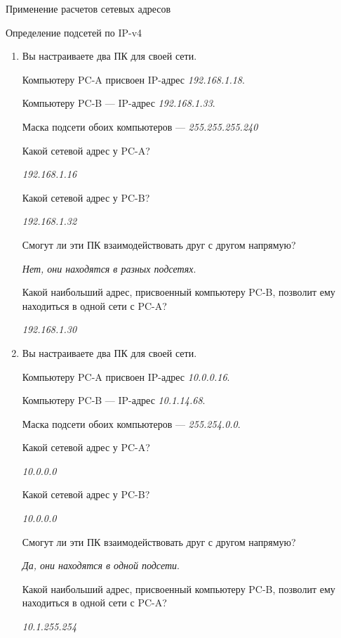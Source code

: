 \documentclass[a4paper,14pt]{extarticle}
\begin{document}
\begin{mypart}{Применение расчетов сетевых адресов}
	\begin{step}{Определение подсетей по IP-v4}
		
		\begin{enumerate}[label=\alph{enumi})]
			\item 
			Вы настраиваете два ПК для своей сети. 
			
			Компьютеру PC-A присвоен IP-адрес \textit{192.168.1.18}.
			
			Компьютеру PC-B — IP-адрес \textit{192.168.1.33}. 
			
			Маска подсети обоих компьютеров — \textit{255.255.255.240}
			
			\q Какой сетевой адрес у PC-A? 
			
			\ans \textit{192.168.1.16}
			
			\q Какой сетевой адрес у PC-B? 
			
			\ans \textit{192.168.1.32}
			
			\q Смогут ли эти ПК взаимодействовать друг с другом напрямую? 
			
			\ans \textit{Нет, они находятся в разных подсетях}.
			
			\q Какой наибольший адрес, присвоенный компьютеру PC-B, позволит ему находиться в одной сети с
			PC-A?
			
			\ans \textit{192.168.1.30}
			
			\item 
			Вы настраиваете два ПК для своей сети. 
			
			Компьютеру PC-A присвоен IP-адрес \textit{10.0.0.16}.
			
			Компьютеру PC-B — IP-адрес \textit{10.1.14.68}. 
			
			Маска подсети обоих компьютеров — \textit{255.254.0.0}.
			
			\q Какой сетевой адрес у PC-A? 
			
			\ans \textit{10.0.0.0}
			
			\q Какой сетевой адрес у PC-B? 
			
			\ans \textit{10.0.0.0}
			
			\q Смогут ли эти ПК взаимодействовать друг с другом напрямую? 
			
			\ans \textit{Да, они находятся в одной подсети}.
			
			\q Какой наибольший адрес, присвоенный компьютеру PC-B, позволит ему находиться в одной сети с
			PC-A?
			
			\ans \textit{10.1.255.254}
		\end{enumerate}
	\end{step}


\end{mypart}
\end{document}
